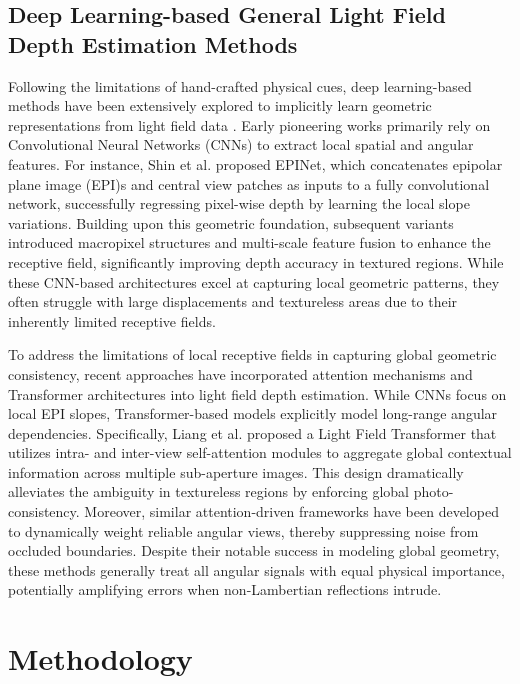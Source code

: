 \documentclass[lettersize,journal]{IEEEtran}
\begin{document}
\subsection{Deep Learning-based General Light Field Depth Estimation Methods}

Following the limitations of hand-crafted physical cues, deep learning-based methods have been extensively explored to implicitly learn geometric representations from light field data \cite{deeplear}. Early pioneering works primarily rely on Convolutional Neural Networks (CNNs) to extract local spatial and angular features. For instance, Shin et al. \cite{cnnbasi} proposed EPINet, which concatenates epipolar plane image (EPI)s and central view patches as inputs to a fully convolutional network, successfully regressing pixel-wise depth by learning the local slope variations. Building upon this geometric foundation, subsequent variants \cite{macpidfne} introduced macropixel structures and multi-scale feature fusion to enhance the receptive field, significantly improving depth accuracy in textured regions. While these CNN-based architectures excel at capturing local geometric patterns, they often struggle with large displacements and textureless areas due to their inherently limited receptive fields.

To address the limitations of local receptive fields in capturing global geometric consistency, recent approaches have incorporated attention mechanisms and Transformer architectures into light field depth estimation. While CNNs focus on local EPI slopes, Transformer-based models explicitly model long-range angular dependencies. Specifically, Liang et al. \cite{transftran} proposed a Light Field Transformer that utilizes intra- and inter-view self-attention modules to aggregate global contextual information across multiple sub-aperture images. This design dramatically alleviates the ambiguity in textureless regions by enforcing global photo-consistency. Moreover, similar attention-driven frameworks \cite{visionappl} have been developed to dynamically weight reliable angular views, thereby suppressing noise from occluded boundaries. Despite their notable success in modeling global geometry, these methods generally treat all angular signals with equal physical importance, potentially amplifying errors when non-Lambertian reflections intrude.

\section{Methodology}
\end{document}
